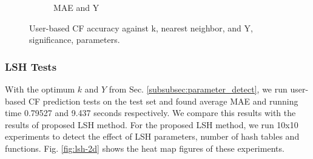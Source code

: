 \documentclass[conference]{IEEEtran}
\begin{document}
\begin{figure}
\begin{subfigure}[b]{0.225\textwidth}
                \caption{MAE and Y}
                \label{fig:mae-y-ub}
        \end{subfigure} 
        \caption{User-based CF accuracy against k, nearest neighbor, and Y, significance, parameters.}
        \label{fig:ub-parameters}
\end{figure}


\subsubsection{LSH Tests}
\label{subsubsec:lsh_tests}

With the optimum $k$ and $Y$ from Sec. \ref{subsubsec:parameter_detect}, 
we run user-based CF prediction tests on the test set and found average MAE 
and running time 0.79527 and 9.437 seconds respectively. We compare this 
results with the results of proposed LSH method. For the proposed LSH method, 
we run 10x10 experiments to detect the effect of LSH parameters, number of hash
tables and functions. Fig. \ref{fig:lsh-2d} shows the heat map figures of these
experiments.
\end{document}
